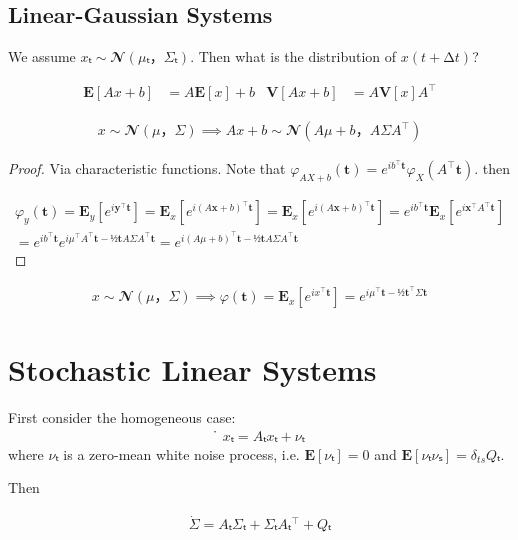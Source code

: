 \documentclass[a4paper, 10pt, margin=2cm]{scrartcl}
\begin{document}
\subsection{Linear-Gaussian Systems}

We assume $xₜ∼𝓝(μₜ，Σₜ)$. Then what is the distribution of $x(t+∆t)$?


\begin{lemma}%
\label{lem: linear transformation exepctation variance}
\begin{align*}%
𝐄[Ax + b] &= A𝐄[x]+b   & 𝐕[Ax+b] &= A𝐕[x]A^⊤
\end{align*}%
\end{lemma}%

%
\begin{lemma}%
\label{lem: gaussian linear}%
%
\begin{align*}%
x∼𝓝(μ，Σ) ⟹ Ax + b ∼𝓝(Aμ+b，AΣA^⊤)%
\end{align*}%
%
\begin{proof}
Via characteristic functions. Note that $φ_{AX+b}(𝐭) = e^{ib^⊤𝐭}φ_X(A^⊤𝐭)$.
then

%
\begin{align*}%
φ_y(𝐭) = 𝐄_y[e^{i 𝐲^⊤ 𝐭}] = 𝐄_x[e^{i (A𝐱+b)^⊤ 𝐭}] = 𝐄_x[e^{i (A𝐱+b)^⊤ 𝐭}] =  e^{ib^⊤ 𝐭}𝐄_x[e^{i 𝐱^⊤A^⊤𝐭}]
\\ =  e^{ib^⊤ 𝐭}  e^{iμ^⊤A^⊤𝐭 - ½𝐭AΣA^⊤𝐭} =  e^{i(Aμ+b)^⊤𝐭 - ½𝐭AΣA^⊤𝐭}%
\end{align*}%
%
\end{proof}
%
\end{lemma}%


%
\begin{lemma}%
\label{lem: label}%
%
\begin{align*}%
x∼𝓝(μ，Σ) ⟹ φ(𝐭) = 𝐄_x [e^{i x^⊤𝐭}] = e^{iμ^⊤ 𝐭 - ½𝐭^⊤Σ𝐭}%
\end{align*}%
%
%
\end{lemma}%





\section{Stochastic Linear Systems}


First consider the homogeneous case:
%
\begin{align*}%
 ̇xₜ = Aₜxₜ + νₜ%
\end{align*}%
%
where $νₜ$ is a zero-mean white noise process, i.e. $𝐄[νₜ] = 0$ and $𝐄[νₜνₛ] = δ_{ts} Qₜ$.

Then

%
\begin{align*}%
\dot{Σ} = AₜΣₜ + ΣₜAₜ^⊤ + Qₜ%
\end{align*}%
%
\end{document}
